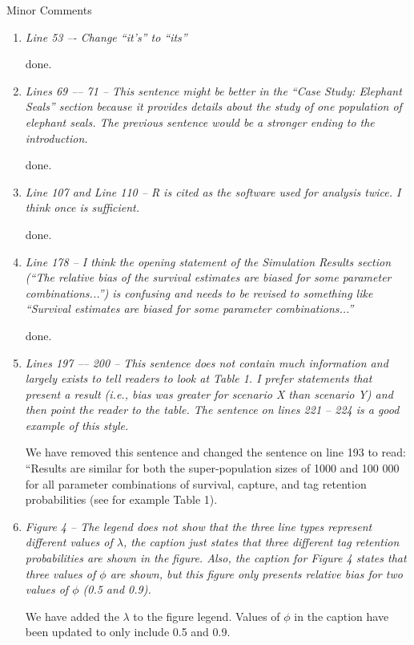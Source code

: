 \documentclass[12pt]{article}
\begin{document}
\begin{enumerate}
\noindent Minor Comments
\begin{enumerate}
\item {\it Line 53 –- Change “it’s” to “its”} 

done.

\item {\it Lines 69 –-- 71 – This sentence might be better in the “Case Study: Elephant Seals” section because it provides details about the study of one population of elephant seals. The previous sentence would be a stronger ending to the introduction.} 

done.

\item {\it Line 107 and Line 110 – R is cited as the software used for analysis twice. I think once is sufficient.} 

done.

\item {\it Line 178 – I think the opening statement of the Simulation Results section (“The relative bias of the survival estimates are biased for some parameter combinations...”) is confusing and needs to be revised to something like “Survival estimates are biased for some parameter combinations...”} 

done.

\item {\it Lines 197 –-- 200 – This sentence does not contain much information and largely exists to tell readers to look at Table 1. I prefer statements that present a result (i.e., bias was greater for scenario X than scenario Y) and then point the reader to the table. The sentence on lines 221 – 224 is a good example of this style.}

We have removed this sentence and changed the sentence on line 193 to read: ``Results are similar for both the super-population sizes of 1000 and 100 000 for all parameter combinations of survival, capture, and tag retention probabilities (see for example Table 1).


\item \textit{Figure 4 – The legend does not show that the three line types represent different values of $\lambda$, the caption just states that three different tag retention probabilities are shown in the figure. Also, the caption for Figure 4 states that three values of $\phi$ are shown, but this figure only presents relative bias for two values of $\phi$ (0.5 and 0.9).}

We have added  the $\lambda$ to the figure legend. Values of $\phi$ in the caption have been updated to only include 0.5 and 0.9. 


\end{enumerate}
\end{enumerate}
\end{document}
